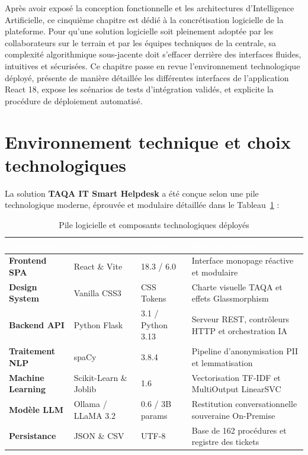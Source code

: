 \documentclass[12pt, a4paper, oneside]{report}
\begin{document}
Après avoir exposé la conception fonctionnelle et les architectures d'Intelligence Artificielle, ce cinquième chapitre est dédié à la concrétisation logicielle de la plateforme. Pour qu'une solution logicielle soit pleinement adoptée par les collaborateurs sur le terrain et par les équipes techniques de la centrale, sa complexité algorithmique sous-jacente doit s'effacer derrière des interfaces fluides, intuitives et sécurisées. Ce chapitre passe en revue l'environnement technologique déployé, présente de manière détaillée les différentes interfaces de l'application React 18, expose les scénarios de tests d'intégration validés, et explicite la procédure de déploiement automatisé.

\section{Environnement technique et choix technologiques}

La solution \textbf{TAQA IT Smart Helpdesk} a été conçue selon une pile technologique moderne, éprouvée et modulaire détaillée dans le Tableau~\ref{tab:stack} :

\begin{table}[H]
\centering
\caption{Pile logicielle et composants technologiques déployés}
\label{tab:stack}
\begin{tabularx}{\textwidth}{|>{\bfseries}p{3.8cm}|p{3.5cm}|p{2.2cm}|X|}
\hline
\rowcolor{themeDark}
\textcolor{white}{Composant} &
\textcolor{white}{Technologie} &
\textcolor{white}{Version} &
\textcolor{white}{Rôle opérationnel} \\
\hline
Frontend SPA & React \& Vite & 18.3 / 6.0 & Interface monopage réactive et modulaire \\
\hline
Design System & Vanilla CSS3 & CSS Tokens & Charte visuelle TAQA et effets Glassmorphism \\
\hline
Backend API & Python Flask & 3.1 / Python 3.13 & Serveur REST, contrôleurs HTTP et orchestration IA \\
\hline
Traitement NLP & spaCy & 3.8.4 & Pipeline d'anonymisation PII et lemmatisation \\
\hline
Machine Learning & Scikit-Learn \& Joblib & 1.6 & Vectorisation TF-IDF et MultiOutput LinearSVC \\
\hline
Modèle LLM & Ollama / LLaMA 3.2 & 0.6 / 3B params & Restitution conversationnelle souveraine On-Premise \\
\hline
Persistance & JSON \& CSV & UTF-8 & Base de 162 procédures et registre des tickets \\
\hline
\end{tabularx}
\end{table}
\end{document}
